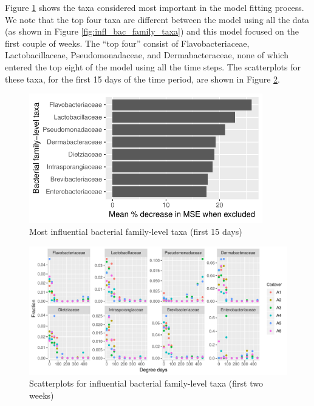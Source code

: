 \documentclass{article}
\begin{document}
Figure \ref{fig:infl_bac_first_15_days_family_taxa} shows the taxa
considered most important in the model fitting process.  We note that
the top four taxa are different between the model using all the data
(as shown in Figure \ref{fig:infl_bac_family_taxa}) and this model
focused on the first couple of weeks.  The ``top four'' consist of
Flavobacteriaceae, Lactobacillaceae, Pseudomonadaceae, and
Dermabacteraceae, none of which entered the top eight of the model
using all the time steps.  The scatterplots for these taxa, for the
first 15 days of the time period, are shown in Figure
\ref{fig:infl_bac_first_15_days_family_scatter}.
\begin{figure}
  \centering
  \includegraphics[width=4in]{../revise_algorithm/only_families/first_two_weeks/hit_1perc_twice/orig_units_first_two_weeks_families_PercIncMSE_barchart}
  \caption{Most influential bacterial family-level taxa (first 15 days)}
  \label{fig:infl_bac_first_15_days_family_taxa}
\end{figure}
\begin{figure}
  \centering
  \includegraphics[width=7.5in]{../revise_algorithm/only_families/first_two_weeks/hit_1perc_twice/infl_bac_family_first_two_weeks_scatter}
  \caption{Scatterplots for influential bacterial family-level taxa (first two weeks)}
  \label{fig:infl_bac_first_15_days_family_scatter}
\end{figure}
\end{document}
